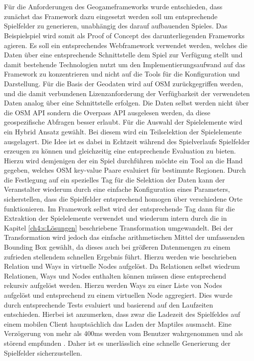 \\\\
Für die Anforderungen des Geogameframeworks wurde entschieden, dass zunächst das Framework dazu eingesetzt werden soll um entsprechende  Spielfelder zu generieren, unabhängig des darauf aufbauenden Spieles. Das Beispielspiel wird somit als Proof of Concept des darunterliegenden Frameworks agieren. Es soll ein entsprechendes Webframework verwendet werden, welches die Daten über eine entsprechende Schnittstelle dem Spiel zur Verfügung stellt und damit bestehende Technologien nutzt um den Implementierungsaufwand auf das Framework zu konzentrieren und nicht auf die Tools für die Konfiguration und Darstellung. Für die Basis der Geodaten wird auf OSM zurückgegriffen werden, und die damit verbundenen Lizenzanforderung der Verfügbarkeit der verwendeten Daten analog über eine Schnittstelle erfolgen. Die Daten selbst werden nicht über die OSM API sondern die Overpass API ausgelesen werden, da diese geospezifische Abfragen besser erlaubt.
Für die Auswahl der Spielelemente wird ein Hybrid Ansatz gewählt. Bei diesem wird ein Teilselektion der Spielelemente ausgelagert.
Die Idee ist es dabei in Echtzeit während des Spielverlaufs Spielfelder erzeugen zu können und gleichzeitig eine entsprechende Evaluation zu bieten. Hierzu wird demjenigen der ein Spiel durchführen möchte ein Tool an die Hand gegeben, welches OSM key-value Paare evaluiert für bestimmte Regionen. Durch die Festlegung auf ein spezielles Tag für die Selektion der Daten kann der Veranstalter wiederum durch eine einfache Konfiguration eines Parameters, sicherstellen, dass die Spielfelder entsprechend homogen über verschiedene Orte funktionieren. Im Framework selbst wird der entsprechende Tag dann für die Extraktion der Spielelemente verwendet und wiederum intern durch die in Kapitel \ref{ch4:s:Lösungen} beschriebene Transformation umgewandelt. Bei der Transformation wird jedoch das einfache arithmetischen Mittel der umfassenden Bounding Box gewählt, da dieses auch bei größeren Datenmengen zu einem zufrieden stellendem schnellen Ergebnis führt. Hierzu werden wie beschrieben Relation und Ways in virtuelle Nodes aufgelöst. Da Relationen selbst wiedrum Relationen, Ways und Nodes enthalten können müssen diese entsprechend rekursiv aufgelöst werden. Hierzu werden Ways zu einer Liste von Nodes aufgelöst und entsprechend zu einem virtuellen Node aggregiert. Dies wurde durch entsprechende Tests evaluiert und basierend auf den Laufzeiten entschieden. Hierbei ist anzumerken, dass zwar die Ladezeit des Spielfeldes auf einem mobilen Client hauptsächlich das Laden der Maptiles ausmacht. Eine Verzögerung von mehr als 400ms werden vom Benutzer wahrgenommen und als störend empfunden \cite{Gutwin.2004}. Daher ist es unerlässlich eine schnelle Generierung der Spielfelder sicherzustellen.

